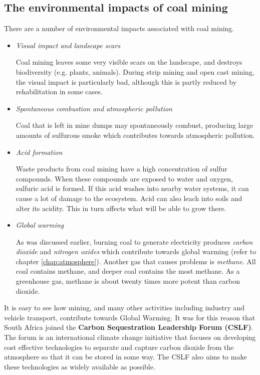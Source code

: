 \subsection{The environmental impacts of coal mining}

There are a number of environmental impacts associated with coal mining.

\begin{itemize}
\item{\textit{Visual impact and landscape scars}

Coal mining leaves some very visible scars on the landscape, and destroys biodiversity (e.g. plants, animals). During strip mining and open cast mining, the visual impact is particularly bad, although this is partly reduced by rehabilitation in some cases.
}

\item{\textit{Spontaneous combustion and atmospheric pollution}

Coal that is left in mine dumps may spontaneously combust, producing large amounts of sulfurous smoke which contributes towards atmospheric pollution.}

\item{\textit{Acid formation}

Waste products from coal mining have a high concentration of sulfur compounds. When these compounds are exposed to water and oxygen, sulfuric acid is formed. If this acid washes into nearby water systems, it can cause a lot of damage to the ecosystem. Acid can also leach into soils and alter its acidity. This in turn affects what will be able to grow there.
}

\item{\textit{Global warming}

As was discussed earlier, burning coal to generate electricity produces \textit{carbon dioxide} and \textit{nitrogen oxides} which contribute towards global warming (refer to chapter \ref{chap:atmosphere}). Another gas that causes problems is \textit{methane}. All coal contains methane, and deeper coal contains the most methane. As a greenhouse gas, methane is about twenty times more potent than carbon dioxide.
}
\end{itemize}

\begin{IFact}{It is easy to see how mining, and many other activities including industry and vehicle transport, contribute towards Global Warming. It was for this reason that South Africa joined the \textbf{Carbon Sequestration Leadership Forum (CSLF)}. The forum is an international climate change initiative that focuses on developing cost effective technologies to separate and capture carbon dioxide from the atmosphere so that it can be stored in some way. The CSLF also aims to make these technologies as widely available as possible.
}
\end{IFact}

